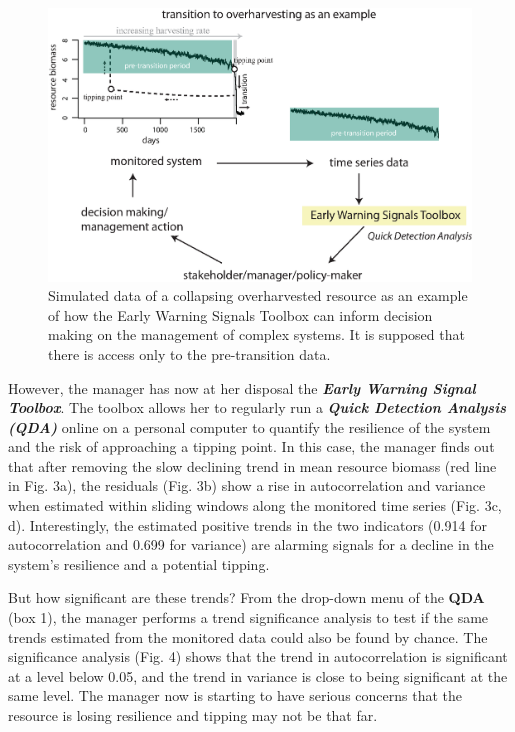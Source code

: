 \documentclass[12pt,a4paper,final]{article}
\begin{document}
\begin{doublespacing}
\begin{figure}[h]
\begin{center}
\includegraphics[scale=0.75]{figure_workflow.eps}
\caption{Simulated data of a collapsing overharvested resource as an example of how the Early Warning Signals Toolbox can inform decision making on the management of complex systems. It is supposed that there is access only to the pre-transition data.}
\end{center}
\label{fig:data}
\end{figure}

However, the manager has now at her disposal the \textbf{\textit{Early Warning Signal Toolbox}}. The toolbox allows her to regularly run a \textbf{\textit{Quick Detection Analysis (QDA)}} online on a personal computer to quantify the resilience of the system and the risk of approaching a tipping point. In this case, the manager finds out that after removing the slow declining trend in mean resource biomass (red line in Fig. 3a), the residuals (Fig. 3b) show a rise in autocorrelation and variance when estimated within sliding windows along the monitored time series (Fig. 3c, d). %
Interestingly, the estimated positive trends in the two indicators (0.914 for autocorrelation and 0.699 for variance) are alarming signals for a decline in the system's resilience and a potential tipping.

But how significant are these trends? From the drop-down menu of the \textbf{QDA} (box 1), the manager performs a trend significance analysis to test if the same trends estimated from the monitored data could also be found by chance. The significance analysis (Fig. 4) shows that the trend in autocorrelation is significant at a level below 0.05, and the trend in variance is close to being significant at the same level. The manager now is starting to have serious concerns that the resource is losing resilience and tipping may not be that far. 


\end{doublespacing}
\end{document}
